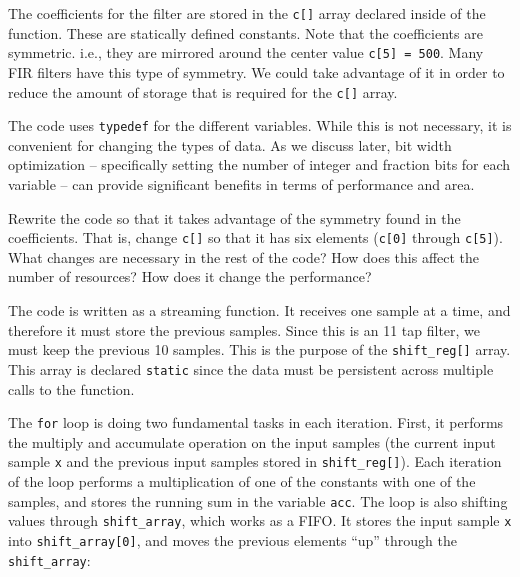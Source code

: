 The coefficients for the filter are stored in the \lstinline{c[]} array declared inside of the function. These are statically defined constants. Note that the coefficients are symmetric. i.e., they are mirrored around the center value \lstinline{c[5] = 500}. Many FIR filters have this type of symmetry. We could take advantage of it in order to reduce the amount of storage that is required for the \lstinline{c[]} array.

The code uses \lstinline{typedef} for the different variables. While this is not necessary, it is convenient for changing the types of data. As we discuss later, bit width optimization -- specifically setting the number of integer and fraction bits for each variable -- can provide significant benefits in terms of performance and area.  

\begin{exercise}
Rewrite the code so that it takes advantage of the symmetry found in the coefficients. That is, change \lstinline{c[]} so that it has six elements (\lstinline{c[0]} through \lstinline{c[5]}). What changes are necessary in the rest of the code? How does this affect the number of resources? How does it change the performance?
\end{exercise}

The code is written as a streaming function. It receives one sample at a time, and therefore it must store the previous samples. Since this is an 11 tap filter, we must keep the previous 10 samples. This is the purpose of the \lstinline{shift_reg[]} array. This array is declared \lstinline{static} since the data must be persistent across multiple calls to the function. 

The \lstinline{for} loop is doing two fundamental tasks in each iteration. First, it performs the multiply and accumulate operation on the input samples (the current input sample \lstinline{x} and the previous input samples stored in \lstinline{shift_reg[]}). Each iteration of the loop performs a multiplication of one of the constants with one of the samples, and stores the running sum in the variable \lstinline{acc}. The loop is also shifting values through \lstinline{shift_array}, which works as a FIFO. It stores the input sample \lstinline{x} into  \lstinline{shift_array[0]}, and moves the previous elements ``up'' through the \lstinline{shift_array}:

